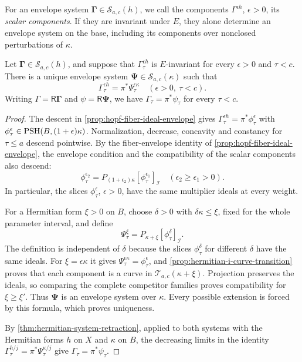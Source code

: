 For an envelope system $\boldsymbol\Gamma\in\mathscr S_{a,c}(h)$, we call the components $\Gamma^{\epsilon h}$, $\epsilon>0$, its \emph{scalar components}. If they are invariant under $E$, they alone determine an envelope system on the base, including its components over nonclosed perturbations of $\kappa$.

\begin{lemma}\label{lem:hopf-transverse-system}
Let $\boldsymbol\Gamma\in\mathscr S_{a,c}(h)$, and suppose that $\Gamma_\tau^{\epsilon h}$ is $E$-invariant for every $\epsilon>0$ and $\tau<c$. There is a unique envelope system $\boldsymbol\Psi\in\mathscr S_{a,c}(\kappa)$ such that
\[
 \Gamma_\tau^{\epsilon h}=\pi^*\Psi_\tau^{\epsilon\kappa}
                 \quad(\epsilon>0,\ \tau<c).
\]
Writing $\Gamma=\mathsf R\boldsymbol\Gamma$ and $\psi=\mathsf R\boldsymbol\Psi$, we have $\Gamma_\tau=\pi^*\psi_\tau$ for every $\tau<c$.
\end{lemma}
\begin{proof}
The descent in \cref{prop:hopf-fiber-ideal-envelope} gives
$\Gamma_\tau^{\epsilon h}=\pi^*\phi_\tau^\epsilon$ with $\phi_\tau^\epsilon\in\mathrm{PSH}(B,(1+\epsilon)\kappa)$. Normalization, decrease, concavity and constancy for $\tau\leq a$ descend pointwise. By the fiber-envelope identity of \cref{prop:hopf-fiber-ideal-envelope}, the envelope condition and the compatibility of the scalar components also descend:
\[
 \phi_\tau^{\epsilon_2}
       =P_{(1+\epsilon_2)\kappa}
             [\phi_\tau^{\epsilon_1}]_{\mathcal I}
                 \quad(\epsilon_2\geq\epsilon_1>0).
\]
In particular, the slices $\phi_\tau^\epsilon$, $\epsilon>0$, have the same multiplier ideals at every weight.

For a Hermitian form $\xi>0$ on $B$, choose $\delta>0$ with $\delta\kappa\leq\xi$, fixed for the whole parameter interval, and define
\[
 \Psi_\tau^\xi=P_{\kappa+\xi}
                       [\phi_\tau^\delta]_{\mathcal I}.
\]
The definition is independent of $\delta$ because the slices $\phi_\tau^\delta$ for different $\delta$ have the same ideals. For $\xi=\epsilon\kappa$ it gives $\Psi_\tau^{\epsilon\kappa}=\phi_\tau^\epsilon$, and \cref{prop:hermitian-i-curve-transition} proves that each component is a curve in $\mathscr T_{a,c}(\kappa+\xi)$. Projection preserves the ideals, so comparing the complete competitor families proves compatibility for $\xi\geq\xi'$. Thus $\boldsymbol\Psi$ is an envelope system over $\kappa$. Every possible extension is forced by this formula, which proves uniqueness.

By \cref{thm:hermitian-system-retraction}, applied to both systems with the Hermitian forms $h$ on $X$ and $\kappa$ on $B$, the decreasing limits in the identity $\Gamma_\tau^{h/j}=\pi^*\Psi_\tau^{\kappa/j}$ give $\Gamma_\tau=\pi^*\psi_\tau$.
\end{proof}

